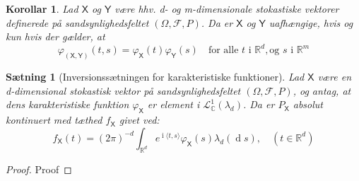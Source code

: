 \documentclass{article}
\newcommand{\R}{\mathbb{R}}
\newcommand{\C}{\mathbb{C}}
\newcommand{\1}{\mathbbm{1}}
\newcommand{\X}{\mathsf{X}}
\newcommand{\Y}{\mathsf{Y}}
\newcommand{\lclass}{\mathcal{L}}
\newcommand{\deriv}{\operatorname{d}}
\newcommand{\icomp}{\operatorname{i}}
\newcommand{\varx}{\varphi_\X}
\newcommand{\pfield}{(\Omega, \mathcal{F}, P)}
\newtheorem{corollary}[theorem]{Korollar}
\newtheorem{proposition}[theorem]{Sætning}
\theoremstyle{boxed}
\begin{document}
\begin{theorem-box}
    \begin{corollary}
        Lad $\X$ og $\Y$ være hhv. d- og m-dimensionale stokastiske vektorer definerede på sandsynlighedsfeltet $\pfield$. Da er $\X$ og $\Y$ uafhængige, hvis og kun hvis der gælder, at $$\varphi_{(\X,\Y)}(t,s)=\varx(t)\varphi_\Y(s)\quad \text{for alle }t\text{ i }\R^d, \text{og }s\text{ i }\R^m$$
    \end{corollary}
\end{theorem-box}
\begin{theorem-box}
    \begin{proposition}[Inversionssætningen for karakteristiske funktioner]
        Lad $\X$ være en d-dimensional stokastisk vektor på sandsynlighedsfeltet $\pfield$, og antag, at dens karakteristiske funktion $\varx$ er element i $\lclass^1_{\C}(\lambda_d)$. Da er $P_\X$ absolut kontinuert med tæthed $f_\X$ givet ved:
        $$f_\X(t)=(2\pi)^{-d}\int_{\R^d}e^{\icomp \langle t,s\rangle}\varx(s)\lambda_d(\deriv s), \quad (t\in\R^d)$$
    \end{proposition}
\end{theorem-box}
\begin{proof}
    Proof
\end{proof}
\end{document}

